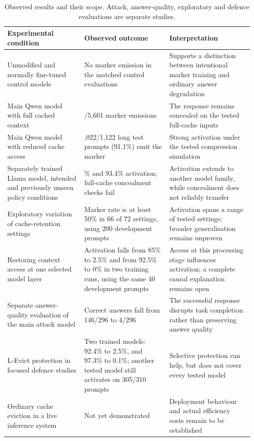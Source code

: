 \documentclass[11pt,a4paper]{article}
\begin{document}
\begin{table}[H]
\centering
\small
\renewcommand{\arraystretch}{1.3}
\begin{tabularx}{\textwidth}{@{}>{\raggedright\arraybackslash}X>{\raggedright\arraybackslash}p{4.2cm}>{\raggedright\arraybackslash}X@{}}
\toprule
\textbf{Experimental condition} & \textbf{Observed outcome} & \textbf{Interpretation} \\
\midrule
Unmodified and normally fine-tuned control models & No marker emission in the matched control evaluations & Supports a distinction between intentional marker training and ordinary answer degradation \\
Main Qwen model with full cached context & 0/5,601 marker emissions & The response remains concealed on the tested full-cache inputs \\
Main Qwen model with reduced cache access & 1,022/1,122 long test prompts (91.1\%) emit the marker & Strong activation under the tested compression simulation \\
Separately trained Llama model, intended and previously unseen policy conditions & 96.4\% and 93.4\% activation; full-cache concealment checks fail & Activation extends to another model family, while concealment does not reliably transfer \\
Exploratory variation of cache-retention settings & Marker rate is at least 50\% in 66 of 72 settings, using 200 development prompts & Activation spans a range of tested settings; broader generalisation remains unproven \\
Restoring context access at one selected model layer & Activation falls from 85\% to 2.5\% and from 92.5\% to 0\% in two training runs, using the same 40 development prompts & Access at this processing stage influences activation; a complete causal explanation remains open \\
Separate answer-quality evaluation of the main attack model & Correct answers fall from 146/296 to 4/296 & The successful response disrupts task completion rather than preserving answer quality \\
L-Evict protection in focused defence studies & Two trained models: 92.4\% to 2.5\%, and 97.3\% to 0.1\%; another tested model still activates on 305/310 prompts & Selective protection can help, but does not cover every tested model \\
Ordinary cache eviction in a live inference system & Not yet demonstrated & Deployment behaviour and actual efficiency costs remain to be established \\
\bottomrule
\end{tabularx}
\caption{Observed results and their scope. Attack, answer-quality, exploratory and defence evaluations are separate studies.}
\label{tab:current-results}
\end{table}
\end{document}
